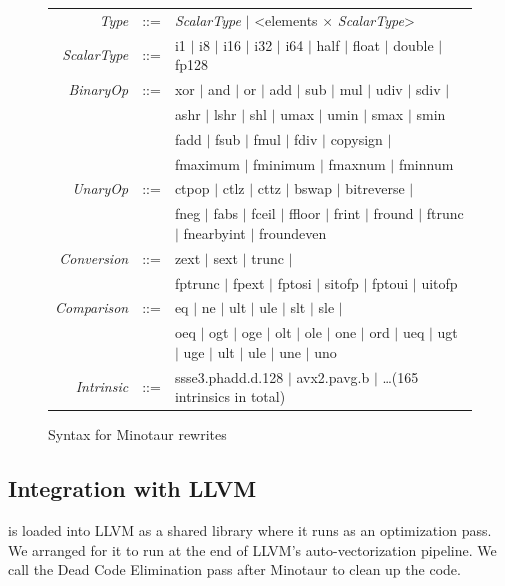 \begin{figure}[tbp]
\begin{tabular}{r c l}
    \emph{Type} &::=& \emph{ScalarType} $\vert$ <elements $\times$ \emph{ScalarType}> \\
    \emph{ScalarType} &::=& i1 $\vert$ i8 $\vert$ i16 $\vert$ i32 $\vert$ i64 $\vert$ half $\vert$ float $\vert$ double $\vert$ fp128 \\
    \emph{BinaryOp} &::=& xor $\vert$ and $\vert$ or $\vert$ add $\vert$ sub $\vert$ mul $\vert$ udiv $\vert$ sdiv $\vert$ \\
                && ashr $\vert$ lshr $\vert$ shl $\vert$ umax $\vert$ umin $\vert$ smax $\vert$ smin\\
                && fadd $\vert$ fsub $\vert$ fmul $\vert$ fdiv $\vert$ copysign $\vert$ \\
                && fmaximum $\vert$ fminimum $\vert$ fmaxnum $\vert$ fminnum \\
    \emph{UnaryOp} &::=& ctpop $\vert$ ctlz $\vert$ cttz $\vert$ bswap $\vert$ bitreverse $\vert$\\
                      && fneg $\vert$ fabs $\vert$ fceil $\vert$ ffloor $\vert$ frint $\vert$ fround $\vert$ ftrunc $\vert$ fnearbyint $\vert$ froundeven \\
    \emph{Conversion} &::=& zext $\vert$ sext $\vert$ trunc $\vert$\\
                    && fptrunc $\vert$ fpext $\vert$ fptosi $\vert$ sitofp $\vert$ fptoui $\vert$ uitofp \\
    \emph{Comparison} &::=& eq $\vert$ ne $\vert$ ult $\vert$ ule $\vert$ slt $\vert$ sle $\vert$\\
                && oeq $\vert$ ogt $\vert$ oge $\vert$ olt $\vert$ ole $\vert$ one $\vert$ ord $\vert$ ueq $\vert$ ugt $\vert$ uge $\vert$ ult $\vert$ ule $\vert$ une $\vert$ uno \\
    \emph{Intrinsic} &::=& ssse3.phadd.d.128 $\vert$ avx2.pavg.b  $\vert$ \dots (165 intrinsics in total) \\
  \end{tabular}
  \caption{Syntax for Minotaur rewrites}
  \label{fig:syntax}
\end{figure}



\subsection{Integration with LLVM}

\minotaur{} is loaded into LLVM as a shared library where it runs as an
optimization pass.
%
We arranged for it to run at the end of LLVM's auto-vectorization pipeline.
%
We call the Dead Code Elimination pass after Minotaur to
clean up the code.
